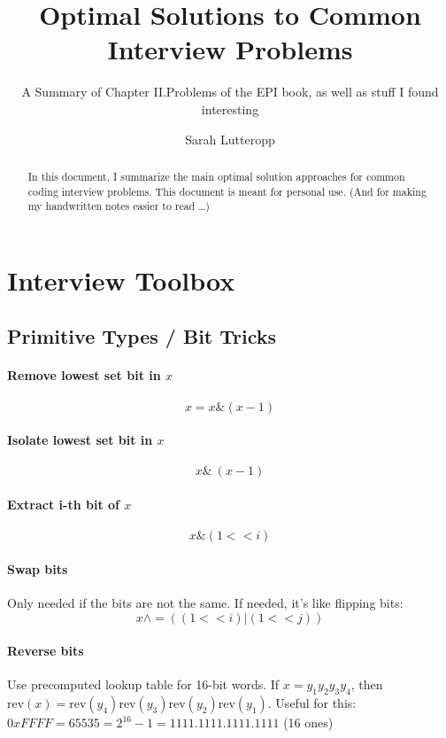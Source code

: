 \documentclass[runningheads]{llncs}
\begin{document}
%
\title{Optimal Solutions to Common Interview Problems}
\subtitle{A Summary of Chapter II.Problems of the EPI book, as well as stuff I found interesting}

\author{Sarah Lutteropp}


\maketitle

\begin{abstract}

In this document, I summarize the main optimal solution approaches for common coding interview problems. This document is meant for personal use. (And for making my handwritten notes easier to read \ldots)

\end{abstract}

\section{Interview Toolbox}

\subsection{Primitive Types / Bit Tricks}

\paragraph{Remove lowest set bit in $x$}
$$x = x \& (x-1)$$

\paragraph{Isolate lowest set bit in $x$}
$$x \& ~(x-1)$$

\paragraph{Extract i-th bit of $x$}
$$x \& (1 << i)$$

\paragraph{Swap bits}
Only needed if the bits are not the same. If needed, it's like flipping bits:
$$x \wedge = ((1 << i) | (1 << j))$$

\paragraph{Reverse bits}
Use precomputed lookup table for 16-bit words.
If $x = y_1 y_2 y_3 y_4$, then $\text{rev}(x) = \text{rev}(y_4) \text{rev}(y_3) \text{rev}(y_2) \text{rev}(y_1) $.
Useful for this: $0xFFFF = 65535 = 2^{16}-1 = 1111.1111.1111.1111$ (16 ones)
\end{document}
